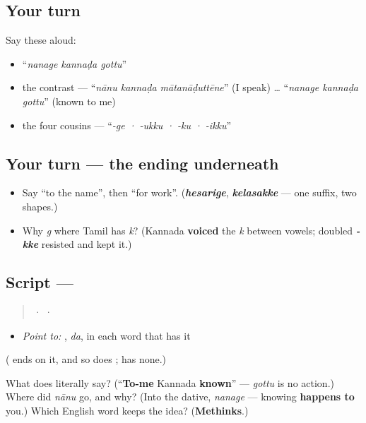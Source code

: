 \subsection*{Your turn}
Say these aloud:

\begin{itemize}
\raggedright
  \item \textquotedblleft{}\emph{nanage kannaḍa gottu}\textquotedblright{}
  \item the contrast — \textquotedblleft{}\emph{nānu kannaḍa mātanāḍuttēne}\textquotedblright{} (I speak) … \textquotedblleft{}\emph{nanage kannaḍa gottu}\textquotedblright{} (known to me)
  \item the four cousins — \textquotedblleft{}\emph{-ge · -ukku · -ku · -ikku}\textquotedblright{}
\end{itemize}

\subsection*{Your turn — the ending underneath}
\begin{itemize}
\raggedright
  \item Say \textquotedblleft{}to the name\textquotedblright{}, then \textquotedblleft{}for work\textquotedblright{}. (\emph{\textbf{hesarige}}, \emph{\textbf{kelasakke}} — one suffix, two shapes.)
  \item Why \emph{g} where Tamil has \emph{k}? (Kannada \textbf{voiced} the \emph{k} between vowels; doubled \emph{\textbf{-kke}} resisted and kept it.)
\end{itemize}

\subsection*{Script — }
\begin{quote}
  ·    ·  
\end{quote}

\begin{itemize}
\raggedright
  \item \emph{Point to:} , \emph{da}, in each word that has it
\end{itemize}

(\textbf{} ends on it, and so does \textbf{}; \textbf{} has none.)

\begin{tcolorbox}[breakable,colback=teal!4,colframe=teal!35!black,title={Before you move on}]
What does \textbf{  } literally say? (\textquotedblleft{}\textbf{To-me} Kannada \textbf{known}\textquotedblright{} — \emph{gottu} is no action.) Where did \emph{nānu} go, and why? (Into the dative, \emph{nanage} — knowing \textbf{happens to} you.) Which English word keeps the idea? (\textbf{Methinks}.)
\end{tcolorbox}
